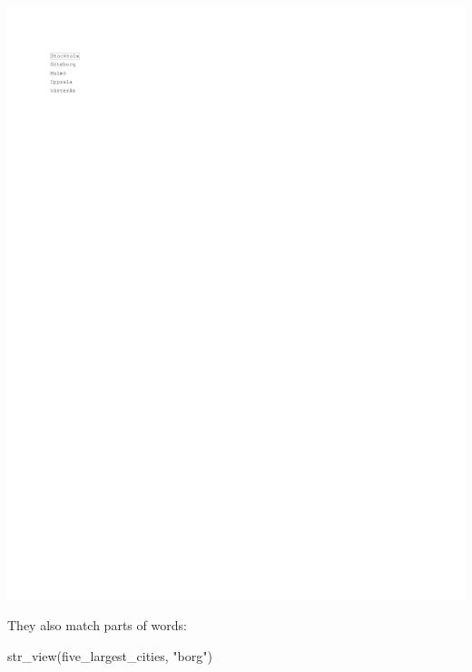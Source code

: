 \documentclass[
]{book}
\newenvironment{Shaded}{\begin{snugshade}}{\end{snugshade}}
\newcommand{\FunctionTok}[1]{\textcolor[rgb]{0.00,0.00,0.00}{#1}}
\newcommand{\NormalTok}[1]{#1}
\newcommand{\StringTok}[1]{\textcolor[rgb]{0.31,0.60,0.02}{#1}}
\begin{document}
\includegraphics{_main_files/figure-latex/unnamed-chunk-18-1.pdf}

They also match parts of words:

\begin{Shaded}
\begin{Highlighting}[]
\FunctionTok{str\_view}\NormalTok{(five\_largest\_cities, }\StringTok{"borg"}\NormalTok{)}
\end{Highlighting}
\end{Shaded}
\end{document}
